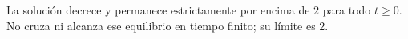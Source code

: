 La solución decrece y permanece estrictamente por encima de \(2\) para todo \(t\ge0\). No cruza ni alcanza ese equilibrio en tiempo finito; su límite es \(2\).
